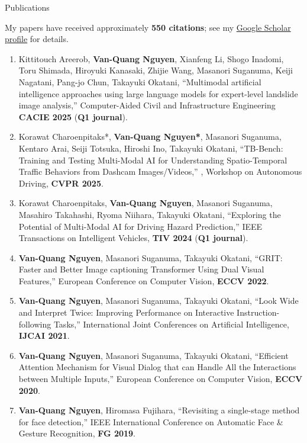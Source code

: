 \documentclass{resume} %
\begin{document}
\begin{rSection}{Publications}

My papers have received approximately \textbf{550 citations}; see my
\href{https://scholar.google.com/citations?user=qR180McAAAAJ}{Google Scholar profile} for details.

\begin{enumerate}
    \item Kittitouch Areerob, \textbf{Van-Quang Nguyen}, Xianfeng Li, Shogo Inadomi, Toru Shimada, Hiroyuki Kanasaki, Zhijie Wang, Masanori Suganuma, Keiji Nagatani, Pang-jo Chun, Takayuki Okatani, “Multimodal artificial intelligence approaches using large language models for expert-level landslide image analysis,” 
Computer-Aided Civil and Infrastructure Engineering \textbf{CACIE 2025} (\textbf{Q1 journal}).

\item  Korawat Charoenpitaks*, \textbf{Van-Quang Nguyen*}, Masanori Suganuma, Kentaro Arai, Seiji Totsuka, Hiroshi Ino, Takayuki Okatani, “TB-Bench: Training and Testing Multi-Modal AI for Understanding Spatio-Temporal Traffic Behaviors from Dashcam Images/Videos,” , Workshop on Autonomous Driving, \textbf{CVPR 2025}.

\item  Korawat Charoenpitaks, \textbf{Van-Quang Nguyen}, Masanori Suganuma, Masahiro Takahashi, Ryoma Niihara, Takayuki Okatani, “Exploring the Potential of Multi-Modal AI for Driving Hazard Prediction,” IEEE Transactions on Intelligent Vehicles, \textbf{TIV 2024} (\textbf{Q1 journal}).

\item  \textbf{Van-Quang Nguyen}, Masanori Suganuma, Takayuki Okatani, “GRIT: Faster and Better Image captioning Transformer Using Dual Visual Features,” European Conference on Computer Vision, \textbf{ECCV 2022}.

\item  \textbf{Van-Quang Nguyen}, Masanori Suganuma, Takayuki Okatani, “Look Wide and Interpret Twice: Improving Performance on Interactive Instruction-following Tasks,” International Joint Conferences on Artificial Intelligence, \textbf{IJCAI 2021}.

\item  \textbf{Van-Quang Nguyen}, Masanori Suganuma, Takayuki Okatani, “Efficient Attention Mechanism for Visual Dialog that can Handle All the Interactions between Multiple Inputs,” European Conference on Computer Vision, \textbf{ECCV 2020}.

\item \textbf{Van-Quang Nguyen}, Hiromasa Fujihara, “Revisiting a single-stage method for face detection,” IEEE International Conference on Automatic Face \& Gesture Recognition, \textbf{FG 2019}.


\end{enumerate}
\end{rSection}
\end{document}
